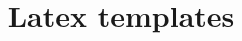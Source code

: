 \documentclass[twocolumn]{revtex4}
\begin{document}
\title{Latex templates}
\maketitle



%
\end{document}
